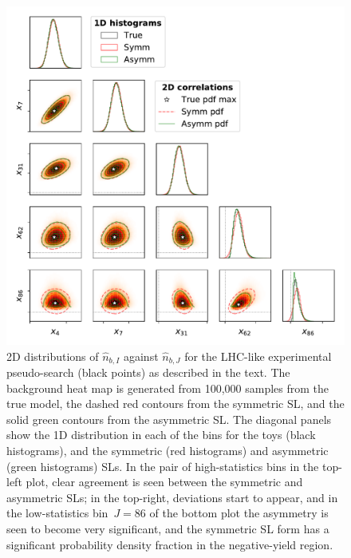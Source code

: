 \documentclass[11pt]{article}
\begin{document}
\begin{figure}[t]
  \centering
  \includegraphics[width=\textwidth]{figures/plotmatrix}
  \caption{2D distributions of $\hat{n}_{b,I}$ against $\hat{n}_{b,J}$ for the LHC-like 
    experimental pseudo-search (black points) as described in the text. The
    background heat map is generated from 100,000 samples from the true 
    model, the dashed red contours from the symmetric SL, and the solid
    green contours from the asymmetric SL. The diagonal panels show the
    1D distribution in each of the bins for the toys (black histograms), and the
    symmetric (red histograms) and asymmetric (green histograms) SLs.
    In the pair of
    high-statistics bins in the top-left plot, clear agreement is seen between
    the symmetric and asymmetric  SLs; in the top-right, deviations start to
    appear, and in the low-statistics bin~$J=86$ of the bottom plot the
    asymmetry is seen to become very significant, and the symmetric  SL form has a
    significant probability density fraction in the negative-yield region.}
  \label{fig:distributions2d}
\end{figure}
\end{document}
